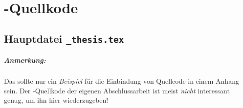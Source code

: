\chapter{\latex-Quellkode}
\label{app:latex}

\section*{Hauptdatei {\tt\_thesis.tex}}

\paragraph{Anmerkung:}
Das sollte nur ein \emph{Beispiel} für die Einbindung von Quellcode
in einem Anhang sein. Der \latex-Quellkode der eigenen
Abschlussarbeit ist meist \emph{nicht} interessant genug, um ihn hier
wiederzugeben!

\begin{footnotesize}

\end{footnotesize}





